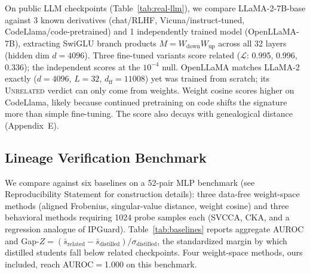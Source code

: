 \documentclass[letterpaper]{article}
\begin{document}
On public LLM checkpoints (Table~\ref{tab:real-llm}), we compare LLaMA-2-7B-base against 3 known derivatives (chat/RLHF, Vicuna/instruct-tuned, CodeLlama/code-pretrained) and 1 independently trained model (OpenLLaMA-7B), extracting SwiGLU branch products $M = W_{\mathrm{down}} W_{\mathrm{up}}$ across all 32 layers (hidden dim $d{=}4096$). Three fine-tuned variants score related ($\mathcal{L}$: 0.995, 0.996, 0.336); the independent scores at the $10^{-4}$ null. OpenLLaMA matches LLaMA-2 exactly ($d{=}4096$, $L{=}32$, $d_{\mathrm{ff}}{=}11008$) yet was trained from scratch; its \textsc{Unrelated} verdict can only come from weights. Weight cosine scores higher on CodeLlama, likely because continued pretraining on code shifts the signature more than simple fine-tuning. The score also decays with genealogical distance (Appendix~E).

\subsection{Lineage Verification Benchmark}\label{sec:exp-baselines}

We compare against six baselines on a 52-pair MLP benchmark (see Reproducibility Statement for construction details): three data-free weight-space methods (aligned Frobenius, singular-value distance, weight cosine) and three behavioral methods requiring 1024 probe samples each (SVCCA, CKA, and a regression analogue of IPGuard). Table~\ref{tab:baselines} reports aggregate AUROC and Gap-$Z = (\bar{s}_{\mathrm{related}} - \bar{s}_{\mathrm{distilled}})/\sigma_{\mathrm{distilled}}$, the standardized margin by which distilled students fall below related checkpoints. Four weight-space methods, ours included, reach AUROC$=$1.000 on this benchmark.
\end{document}
